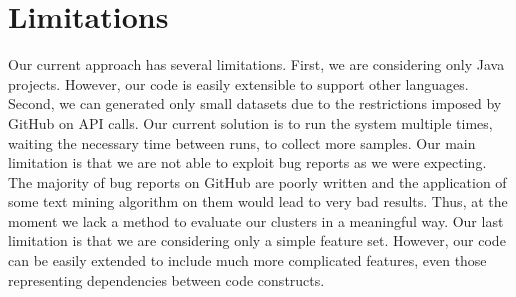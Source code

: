 \section{Limitations}
\label{sec:limitations}

Our current approach has several limitations. First, we are considering only Java projects. However, our code is easily extensible to support other languages. Second, we can generated only small datasets due to the restrictions imposed by GitHub on API calls. Our current solution is to run the system multiple times, waiting the necessary time between runs, to collect more samples. Our main limitation is that we are not able to exploit bug reports as we were expecting. The majority of bug reports on GitHub are poorly written and the application of some text mining algorithm on them would lead to very bad results. Thus, at the moment we lack a method to evaluate our clusters in a meaningful way. Our last limitation is that we are considering only a simple feature set. However, our code can be easily extended to include much more complicated features, even those representing dependencies between code constructs.